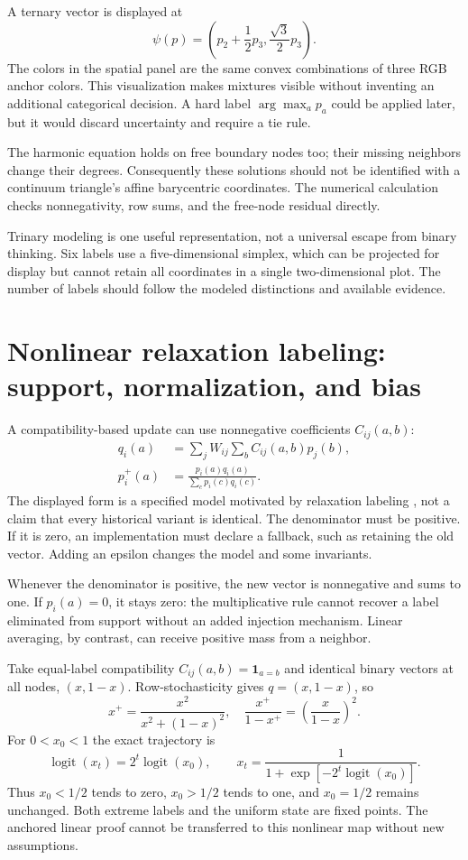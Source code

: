 \documentclass[12pt]{article}
\newcommand{\page}[1]{\section{#1}}
\begin{document}
A ternary vector is displayed at
\begin{equation}\psi(p)=\left(p_2+\frac12p_3,\frac{\sqrt3}{2}p_3\right).\end{equation}
The colors in the spatial panel are the same convex combinations of three RGB anchor colors. This visualization makes mixtures visible without inventing an additional categorical decision. A hard label $\arg\max_a p_a$ could be applied later, but it would discard uncertainty and require a tie rule.

The harmonic equation holds on free boundary nodes too; their missing neighbors change their degrees. Consequently these solutions should not be identified with a continuum triangle's affine barycentric coordinates. The numerical calculation checks nonnegativity, row sums, and the free-node residual directly.

Trinary modeling is one useful representation, not a universal escape from binary thinking. Six labels use a five-dimensional simplex, which can be projected for display but cannot retain all coordinates in a single two-dimensional plot. The number of labels should follow the modeled distinctions and available evidence.

\page{Nonlinear relaxation labeling: support, normalization, and bias}
A compatibility-based update can use nonnegative coefficients $C_{ij}(a,b)$:
\begin{align}q_i(a)&=\sum_jW_{ij}\sum_b C_{ij}(a,b)p_j(b),\\p_i^+(a)&=\frac{p_i(a)q_i(a)}{\sum_c p_i(c)q_i(c)}.\end{align}
The displayed form is a specified model motivated by relaxation labeling \cite{rosenfeld,hummel}, not a claim that every historical variant is identical. The denominator must be positive. If it is zero, an implementation must declare a fallback, such as retaining the old vector. Adding an epsilon changes the model and some invariants.

Whenever the denominator is positive, the new vector is nonnegative and sums to one. If $p_i(a)=0$, it stays zero: the multiplicative rule cannot recover a label eliminated from support without an added injection mechanism. Linear averaging, by contrast, can receive positive mass from a neighbor.

Take equal-label compatibility $C_{ij}(a,b)=\mathbf1_{a=b}$ and identical binary vectors at all nodes, $(x,1-x)$. Row-stochasticity gives $q=(x,1-x)$, so
\begin{equation}x^+=\frac{x^2}{x^2+(1-x)^2},\quad\frac{x^+}{1-x^+}=\left(\frac{x}{1-x}\right)^2.\end{equation}
For $0<x_0<1$ the exact trajectory is
\begin{equation}\operatorname{logit}(x_t)=2^t\operatorname{logit}(x_0),\qquad x_t=\frac1{1+\exp[-2^t\operatorname{logit}(x_0)]}.\end{equation}
Thus $x_0<1/2$ tends to zero, $x_0>1/2$ tends to one, and $x_0=1/2$ remains unchanged. Both extreme labels and the uniform state are fixed points. The anchored linear proof cannot be transferred to this nonlinear map without new assumptions.
\end{document}
